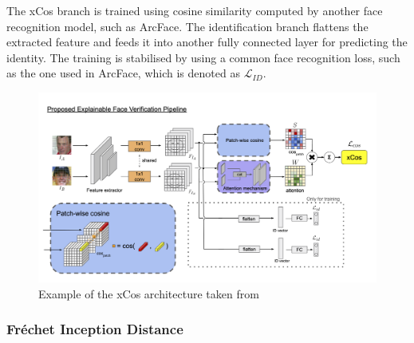 %
The xCos branch is trained using cosine similarity computed by another face recognition model, such as ArcFace. The identification branch flattens the extracted feature and feeds it into another fully connected layer for predicting the identity. The training is stabilised by using a common face recognition loss, such as the one used in ArcFace, which is denoted as $\mathcal{L}_{ID}$.
\begin{figure}[h!]
\centering
  \includegraphics[scale=0.5]{figures/xCos-architecture.png}
  \caption{Example of the xCos architecture taken from~\cite{xCos}}
  \label{fig:xCos architecture}
\end{figure}

\subsubsection{Fréchet Inception Distance}
